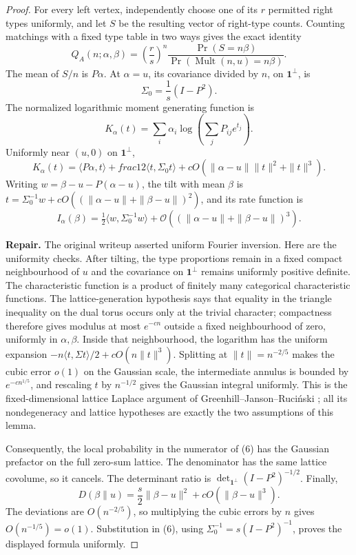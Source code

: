 \documentclass[11pt,a4paper]{article}
\theoremstyle{plain}
\theoremstyle{definition}
\theoremstyle{remark}
\newcommand{\one}{\mathbf 1}
\newcommand{\cO}{\mathcal O}
\newcommand{\repair}[1]{\begin{tcolorbox}[colback=yellow!7,colframe=gray!60,boxrule=0.3pt,arc=1pt,left=5pt,right=5pt,top=3pt,bottom=3pt]\small\textbf{Repair.} #1\end{tcolorbox}}
\begin{document}
\label{pf:matching}
\lemmatching*
\begin{proof}
For every left vertex, independently choose one of its $r$ permitted right types
uniformly, and let $S$ be the resulting vector of right-type counts.  Counting matchings
with a fixed type table in two ways gives the exact identity
\[
 Q_A(n;\alpha,\beta)=
 \left(\frac rs\right)^n
 \frac{\Pr(S=n\beta)}{\Pr(\operatorname{Mult}(n,u)=n\beta)}.    \tag{6}
\]
The mean of $S/n$ is $P\alpha$.  At $\alpha=u$, its covariance divided by $n$, on
$\one^\perp$, is
\[
 \Sigma_0=\frac1s(I-P^2).
\]
The normalized logarithmic moment generating function is
\[
 K_\alpha(t)=\sum_i\alpha_i\log\left(\sum_jP_{ij}e^{t_j}\right).
\]
Uniformly near $(u,0)$ on $\one^\perp$,
\[
 K_\alpha(t)=\langle P\alpha,t\rangle+	frac12\langle
 t,\Sigma_0t\rangle+cO(\|\alpha-u\|\|t\|^2+\|t\|^3).
\]
Writing $w=\beta-u-P(\alpha-u)$, the tilt with mean $\beta$ is
$t=\Sigma_0^{-1}w+cO((\|\alpha-u\|+\|\beta-u\|)^2)$, and its rate function is
\[
 I_\alpha(\beta)=\tfrac12\langle w,\Sigma_0^{-1}w\rangle
 +\cO((\|\alpha-u\|+\|\beta-u\|)^3).                           \tag{7}
\]

\repair{The original writeup asserted uniform Fourier inversion.  Here are the
uniformity checks.  After tilting, the type proportions remain in a fixed compact
neighbourhood of $u$ and the covariance on $\one^\perp$ remains uniformly positive
definite.  The characteristic function is a product of finitely many categorical
characteristic functions.  The lattice-generation hypothesis says that equality in
the triangle inequality on the dual torus occurs only at the trivial character;
compactness therefore gives modulus at most $e^{-cn}$ outside a fixed neighbourhood
of zero, uniformly in $\alpha,\beta$.  Inside that neighbourhood, the logarithm has
the uniform expansion $-n\langle t,\Sigma t\rangle/2+cO(n\|t\|^3)$.  Splitting at
$\|t\|=n^{-2/5}$ makes the cubic error $o(1)$ on the Gaussian scale, the intermediate
annulus is bounded by $e^{-cn^{1/5}}$, and rescaling $t$ by $n^{-1/2}$ gives the
Gaussian integral uniformly.  This is the fixed-dimensional lattice Laplace argument
of Greenhill--Janson--Ruciński \cite{GJR10}; all its nondegeneracy and lattice
hypotheses are exactly the two assumptions of this lemma.}

Consequently, the local probability in the numerator of (6) has the Gaussian
prefactor on the full zero-sum lattice.  The denominator has the same lattice
covolume, so it cancels.  The determinant ratio is
$\det_{\one^\perp}(I-P^2)^{-1/2}$.  Finally,
\[
 D(\beta\|u)=\frac s2\|\beta-u\|^2+cO(\|\beta-u\|^3).
\]
The deviations are $O(n^{-2/5})$, so multiplying the cubic errors by $n$ gives
$O(n^{-1/5})=o(1)$.  Substitution in (6), using
$\Sigma_0^{-1}=s(I-P^2)^{-1}$, proves the displayed formula uniformly.
\end{proof}
\end{document}

